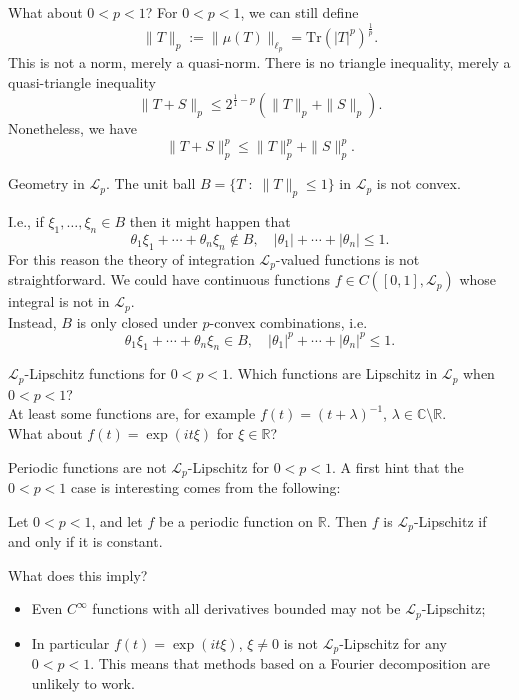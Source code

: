 \documentclass{beamer}
\numberwithin{equation}{section}
\theoremstyle{plain}
\theoremstyle{plain}
\theoremstyle{definition}
\theoremstyle{plain}
\theoremstyle{plain}
\theoremstyle{definition}
\newcommand{\Rl}{\mathbb{R}}
\newcommand{\Cplx}{\mathbb{C}}
\newcommand{\Lc}{\mathcal{L}}
\newcommand{\Tr}{\mathrm{Tr}}
\begin{document}
\begin{frame}{What about $0 < p < 1$?}
    For $0 < p < 1$, we can still define
    $$
        \|T\|_p := \|\mu(T)\|_{\ell_p} = \Tr(|T|^p)^{\frac1p}.
    $$
    This is not a norm, merely a quasi-norm. There is no triangle inequality, merely a quasi-triangle inequality
    $$
        \|T+S\|_p \leq 2^{\frac11-p}(\|T\|_p+\|S\|_p).
    $$
    \pause
    Nonetheless, we have
    \[
        \|T+S\|_p^p \leq \|T\|_p^p+\|S\|_p^p.
    \]
\end{frame}


\begin{frame}{Geometry in $\Lc_p.$}
    The unit ball $B = \{T\;:\; \|T\|_p\leq 1\}$ in $\Lc_p$ is not convex.

    I.e., if $\xi_1,\ldots,\xi_n\in B$ then it might happen that
    \[
        \theta_1\xi_1+\cdots+\theta_n\xi_n\notin B,\quad |\theta_1|+\cdots+|\theta_n|\leq 1.
    \]
    For this reason the theory of integration $\Lc_p$-valued functions is not straightforward. We could have continuous functions $f \in C([0,1],\Lc_p)$
    whose integral is not in $\Lc_p.$\\
    \pause
    Instead, $B$ is only closed under $p$-convex combinations, i.e.
    \[
        \theta_1\xi_1+\cdots+\theta_n \xi_n \in B,\quad |\theta_1|^p+\cdots+|\theta_n|^p \leq 1.
    \]
\end{frame}


\begin{frame}{$\Lc_p$-Lipschitz functions for $0 < p < 1.$}
    Which functions are Lipschitz in $\Lc_p$ when $0 < p < 1$? \\
    \pause
    At least some functions are, for example $f(t) = (t+\lambda)^{-1}$, $\lambda \in \Cplx\setminus \Rl.$\\
    \pause
    What about $f(t) = \exp(it\xi)$ for $\xi\in \Rl$?
\end{frame} 

\begin{frame}{Periodic functions are not $\Lc_p$-Lipschitz for $0 < p < 1$.}
    A first hint that the $0 < p < 1$ case is interesting comes from the following:
    \begin{lemma}
        Let $0 < p < 1$, and let $f$ be a periodic function on $\Rl$. Then $f$ is $\Lc_p$-Lipschitz
        if and only if it is constant.
    \end{lemma}
    What does this imply?\pause
    \begin{itemize}
        \item{} Even $C^\infty$ functions with all derivatives bounded may not be $\Lc_p$-Lipschitz;\\
        \item{} In particular $f(t) = \exp(it\xi)$, $\xi\neq 0$ is not $\Lc_p$-Lipschitz for any $0 < p < 1.$ This means that methods based on a Fourier decomposition
        are unlikely to work.
    \end{itemize}
\end{frame}
\end{document}
